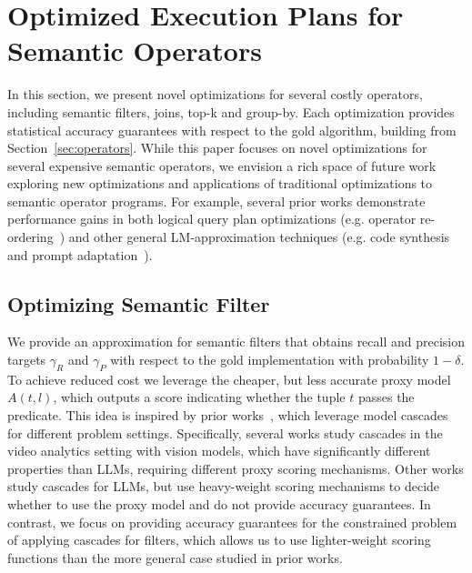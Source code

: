\section{Optimized Execution Plans for Semantic Operators} 
\label{sec:impl}

In this section, we present novel optimizations for several costly operators, including semantic filters, joins, top-k and group-by. Each optimization provides statistical accuracy guarantees with respect to the gold algorithm, building from Section~\ref{sec:operators}.
While this paper focuses on novel optimizations for several expensive semantic operators, we envision a rich space of future work exploring new optimizations and applications of traditional optimizations to semantic operator programs. For example, several prior works demonstrate performance gains in both logical query plan optimizations (e.g. operator re-ordering~\cite{liu_suql_2024, liu_declarative_2024, lin_towards_2024, lu_accelerating_2018}) and other general LM-approximation techniques (e.g. code synthesis~\cite{arora_language_2023, liu_declarative_2024} and prompt adaptation~\cite{chen_frugalgpt_2023}).


\subsection{Optimizing Semantic Filter}



\label{subsubsec:filter_cascade} We provide an approximation for semantic filters that obtains recall and precision targets $\gamma_R$ and $\gamma_P$ with respect to the gold implementation with probability $1-\delta$. To achieve reduced cost we leverage the cheaper, but less accurate proxy model $A(t, l)$, which outputs a score indicating whether the tuple $t$ passes the predicate.
This idea is inspired by prior works~\cite{viola_rapid_2001, yue_large_2024, chen_frugalgpt_2023, kang_noscope_2017, kang_approximate_2022, yue_large_2024}, which leverage model cascades for different problem settings. Specifically, several works study cascades in the video analytics setting with vision models, which have significantly different properties than LLMs, requiring different proxy scoring mechanisms. Other works study cascades for LLMs, but use heavy-weight scoring mechanisms to decide whether to use the proxy model and do not provide accuracy guarantees. In contrast, we focus on providing accuracy guarantees for the constrained problem of applying cascades for filters, which allows us to use lighter-weight scoring functions than the more general case studied in prior works.

